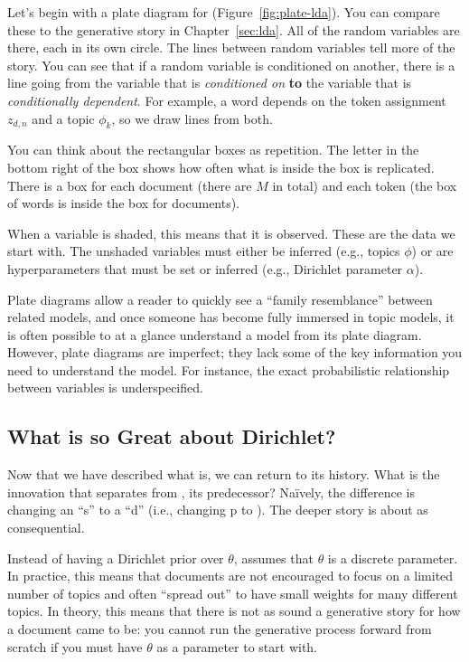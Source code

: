 Let's begin with a plate diagram for 
(Figure~\ref{fig:plate-lda}).  You can compare these to the generative
story in Chapter~\ref{sec:lda}.  All of the random variables are
there, each in its own circle.  The lines between random variables
tell more of the story.  You can see that if a random variable is
conditioned on another, there is a line going from the variable that
is \emph{conditioned on} {\bf to} the variable that is
\emph{conditionally dependent}.  For example, a word depends on the
token assignment $z_{d,n}$ and a topic $\phi_k$, so we draw lines
from both.

You can think about the rectangular boxes as repetition.  The letter
in the bottom right of the box shows how often what is inside the box
is replicated.  There is a box for each document (there are $M$ in
total) and each token (the box of words is inside the box for
documents).

When a variable is shaded, this means that it is observed.  These are
the data we start with.  The unshaded variables must either be
inferred (e.g., topics $\phi$) or are hyperparameters that must be set
or inferred (e.g., Dirichlet parameter $\alpha$).

Plate diagrams allow a reader to quickly see a ``family resemblance''
between related models, and once someone has become fully immersed in
topic models, it is often possible to at a glance understand a model
from its plate diagram.  However, plate diagrams are imperfect; they
lack some of the key information you need to understand the model.
For instance, the exact probabilistic relationship between variables
is underspecified.

\subsection{What is so Great about Dirichlet?}
\label{sec:plsa-vs-lda}

Now that we have described what  is, we can return to its
history.  What is the innovation that separates  from
\plsa{}, its predecessor?  Na\"ively, the difference is changing an
``s'' to a ``d'' (i.e., changing p to ).  The deeper story is about as consequential.

Instead of having a Dirichlet prior over $\theta$, \plsa{} assumes
that $\theta$ is a discrete parameter.  In practice, this
means that documents are not encouraged to focus on a limited number of
topics and often ``spread out'' to have small weights for many
different topics.  In theory, this means that there is not as sound a
generative story for how a document came to be: you cannot run the
generative process forward from scratch if you must have $\theta$ as a
parameter to start with.

